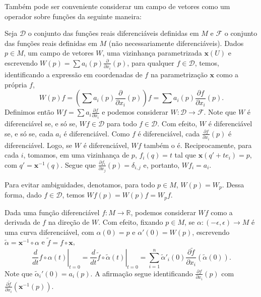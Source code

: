 Também pode ser conveniente considerar um campo de vetores como um operador sobre funções da seguinte maneira:
\begin{observation}
	\label{obs:campo-como-transformada}
	Seja $\mathcal{D}$ o conjunto das funções reais diferenciáveis definidas em $M$ e $\mathcal{F}$ o conjunto das funções reais definidas em $M$ (não necessariamente diferenciáveis).
	Dados $p \in M$, um campo de vetores $W$, uma vizinhança parametrizada $\mathbf{x}(U)$ e escrevendo $W(p)=\sum a_{i}(p)\frac{\partial}{\partial x_{i}}(p)$, para qualquer $f \in \mathcal{D}$, temos, identificando a expressão em coordenadas de $f$ na parametrização $\mathbf{x}$ como a própria $f$,
	\begin{equation*}
		W(p)f=(\sum a_{i}(p)\frac{\partial }{\partial x_{i}}(p))f=\sum a_{i}(p)\frac{\partial f}{\partial x_{i}}(p).
	\end{equation*}
	Definimos então $Wf=\sum a_{i}\frac{\partial f}{\partial x_{i}}$ e podemos considerar $W:\mathcal{D}\to \mathcal{F}$.
	Note que $W$ é diferenciável se, e só se, $Wf \in \mathcal{D}$ para todo $f \in \mathcal{D}$. Com efeito, $W$ é diferenciável se, e só se, cada $a_{i}$ é diferenciável. Como $f$ é diferenciável, cada $\frac{\partial f}{\partial x_{i}}(p)$ é diferenciável. Logo, se $W$ é diferenciável, $Wf$ também o é. Reciprocamente, para cada $i$, tomamos, em uma vizinhança de $p$, $f_{i}(q)=t$ tal que $\mathbf{x}(q'+te_{i})=p$, com $q'=\mathbf{x}^{-1}(q)$. Segue que $\frac{\partial f_{i}}{\partial x_{j}}(p)=\delta_{i,j}$ e, portanto, $Wf_{i}=a_{i}$.
\end{observation}
Para evitar ambiguidades, denotamos, para todo $p \in M$, $W(p)=W_{p}$. Dessa forma, dado $f \in \mathcal{D}$, temos $Wf(p)=W(p)f=W_{p}f$.

Dada uma função diferenciável $f:M\to \mathbb{R}$, podemos considerar $Wf$ como a derivada de $f$ na direção de $W$. Com efeito, fixando $p \in M$, se $\alpha:(-\epsilon, \epsilon)\to M$ é uma curva diferenciável, com $\alpha(0)=p$ e $\alpha'(0)=W(p)$, escrevendo $\tilde{\alpha}=\mathbf{x}^{-1} \circ\alpha$ e $\tilde{f}=f \circ \mathbf{x}$,
\begin{equation*}
	\left.\frac{d}{dt}f \circ \alpha(t)\right|_{t=0}= \left.\frac{d}{dt}\tilde{f} \circ  \tilde{\alpha}(t)\right|_{t=0}=\sum_{i=1}^{n}\tilde{\alpha}'_{i}(0)\frac{\partial \tilde{f}}{\partial x_{i}}(\tilde{\alpha}(0)).
\end{equation*}
Note que $\tilde{\alpha}_{i}'(0)=a_{i}(p)$. A afirmação segue identificando $\frac{\partial f}{\partial x_{i}}(p)$ com $\frac{\partial \tilde{f}}{\partial x_{i}}(\mathbf{x}^{-1}(p))$.

